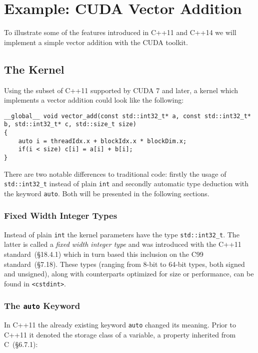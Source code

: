 \section{Example: CUDA Vector Addition}

To illustrate some of the features introduced in C++11 and C++14 we will implement a simple vector addition with the CUDA toolkit.

\subsection{The Kernel}

Using the subset of C++11 supported by CUDA 7 and later, a kernel which implements a vector addition could look like the following:

\begin{lstlisting}
__global__ void vector_add(const std::int32_t* a, const std::int32_t* b, std::int32_t* c, std::size_t size)
{
    auto i = threadIdx.x + blockIdx.x * blockDim.x;
    if(i < size) c[i] = a[i] + b[i];
}
\end{lstlisting}

There are two notable differences to traditional code: firstly the usage of \texttt{std::int32\_t} instead of plain \texttt{int} and secondly automatic type deduction with the keyword \texttt{auto}. Both will be presented in the following sections.

\subsubsection{Fixed Width Integer Types}

Instead of plain \texttt{int} the kernel parameters have the type \texttt{std::int32\_t}. The latter is called a \textit{fixed width integer type} and was introduced with the C++11 standard~\cite{cpp11std}(§18.4.1) which in turn based this inclusion on the C99 standard~\cite{c99std}(§7.18). These types (ranging from 8-bit to 64-bit types, both signed and unsigned), along with counterparts optimized for size or performance, can be found in \texttt{<cstdint>}.

\subsubsection{The \texttt{auto} Keyword}

In C++11 the already existing keyword \texttt{auto} changed its meaning. Prior to C++11 it denoted the storage class of a variable, a property inherited from C~\cite{c99std}(§6.7.1):

